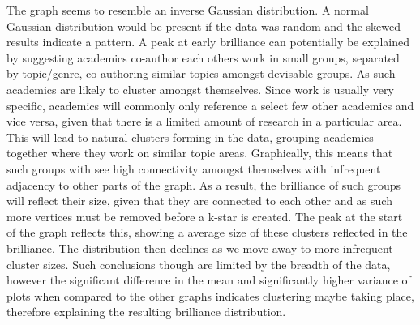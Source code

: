 \documentclass[12pt,a4paper]{article}
\begin{document}
The graph seems to resemble an inverse Gaussian distribution. A normal Gaussian distribution would be present if the data was random and the skewed results indicate a pattern. A peak at early brilliance can potentially be explained by suggesting academics co-author each others work in small groups, separated by topic/genre, co-authoring similar topics amongst devisable groups. As such academics are likely to cluster amongst themselves. Since work is usually very specific, academics will commonly only reference a select few other academics and vice versa, given that there is a limited amount of research in a particular area. This will lead to natural clusters forming in the data, grouping academics together where they work on similar topic areas. Graphically, this means that such groups with see high connectivity amongst themselves with infrequent adjacency to other parts of the graph. As a result, the brilliance of such groups will reflect their size, given that they are connected to each other and as such more vertices must be removed before a k-star is created. The peak at the start of the graph reflects this, showing a average size of these clusters reflected in the brilliance. The distribution then declines as we move away to more infrequent cluster sizes. Such conclusions though are limited by the breadth of the data, however the significant difference in the mean and significantly higher variance of plots when compared to the other graphs indicates clustering maybe taking place, therefore explaining the resulting brilliance distribution.
  
\end{document}
